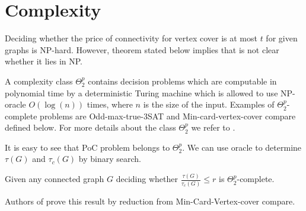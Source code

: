 \section{Complexity}
Deciding whether the price of connectivity for vertex cover is at most \(t\) for given graphs is NP-hard. 
However, theorem stated below implies that is not clear whether it lies in NP. 

A complexity class \(\Theta_2^p\) contains decision problems which are computable in polynomial time by 
a deterministic Turing machine which is allowed to use NP-oracle \(O(\log(n))\) times, where \(n\) is the size of the input.
Examples of \(\Theta_2^p\)-complete problems are 
Odd-max-true-3SAT and Min-card-vertex-cover compare defined below. For more details about the class \(\Theta_2^p\) we refer to \cite{Spakowski00}.

\begin{problem}
\end{problem}

\begin{problem}
\end{problem}

It is easy to see that PoC problem belongs to \(\Theta_2^p\). 
We can use oracle to determine \(\tau(G)\) and \(\tau_c(G)\) by binary search.

\begin{thm}\label{compl:01}
	Given any connected graph \(G\) deciding whether \(\frac{\tau(G)}{\tau_c(G)} \leq r\)
	is \(\Theta_2^p\)-complete.
\end{thm}
Authors of \cite{CambyCardinalFioriniSchaudt14} prove this result by reduction from Min-Card-Vertex-cover compare.

